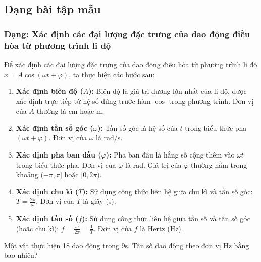 

\subsection{Dạng bài tập mẫu}

\subsubsection{Dạng: Xác định các đại lượng đặc trưng của dao động điều hòa từ phương trình li độ}
\begin{phuongphap}
Để xác định các đại lượng đặc trưng của dao động điều hòa từ phương trình li độ $x = A\cos(\omega t + \varphi)$, ta thực hiện các bước sau:
\begin{enumerate}
    \item \textbf{Xác định biên độ ($A$):} Biên độ là giá trị dương lớn nhất của li độ, được xác định trực tiếp từ hệ số đứng trước hàm $\cos$ trong phương trình. Đơn vị của $A$ thường là cm hoặc m.
    \item \textbf{Xác định tần số góc ($\omega$):} Tần số góc là hệ số của $t$ trong biểu thức pha $(\omega t + \varphi)$. Đơn vị của $\omega$ là rad/s.
    \item \textbf{Xác định pha ban đầu ($\varphi$):} Pha ban đầu là hằng số cộng thêm vào $\omega t$ trong biểu thức pha. Đơn vị của $\varphi$ là rad. Giá trị của $\varphi$ thường nằm trong khoảng $(-\pi, \pi]$ hoặc $[0, 2\pi)$.
    \item \textbf{Xác định chu kì ($T$):} Sử dụng công thức liên hệ giữa chu kì và tần số góc: $T = \frac{2\pi}{\omega}$. Đơn vị của $T$ là giây (s).
    \item \textbf{Xác định tần số ($f$):} Sử dụng công thức liên hệ giữa tần số và tần số góc (hoặc chu kì): $f = \frac{\omega}{2\pi} = \frac{1}{T}$. Đơn vị của $f$ là Hertz (Hz).
\end{enumerate}
\end{phuongphap}
\begin{vidumau}
Một vật thực hiện 18 dao động trong $9 \text{s}$. Tần số dao động theo đơn vị Hz bằng bao nhiêu?
\end{vidumau}

